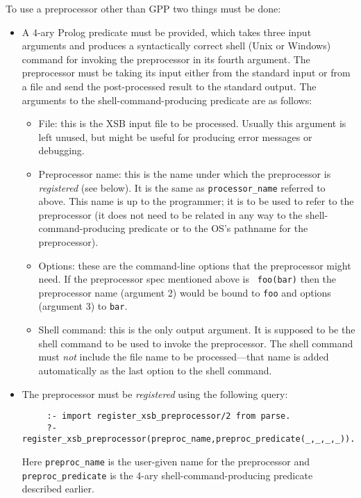 \begin{description}
  To use a preprocessor other than GPP two things must be done:
  \begin{itemize}
  \item A 4-ary Prolog predicate must be provided, which takes three input
    arguments and produces a syntactically correct shell (Unix or Windows)
    command for invoking the preprocessor in its fourth argument. The
    preprocessor must be taking its input either from the standard input
    or from a file and send the post-processed result to the standard
    output. The arguments to the shell-command-producing predicate are as
    follows:
    \begin{itemize}
    \item   File: this is the XSB input file to be processed. Usually this
      argument is left unused, but might be useful for producing error
      messages or debugging.
    \item   Preprocessor name: this is the name under which the
      preprocessor is \emph{registered} (see below). It is the same as
      {\tt processor\_name} referred to above.  This name is  
      up to the programmer; it is
      to be used to refer to the preprocessor (it does not need to be
      related in any way to
      the shell-command-producing predicate or to the OS's pathname for the
      preprocessor).
    \item Options: these are the command-line options that the preprocessor
      might need. If the preprocessor spec mentioned above is {\tt
        foo(bar)} then the preprocessor name (argument 2) would be bound to
      {\tt foo} and options (argument 3) to {\tt bar}.
    \item Shell command: this is the only output argument. It is supposed
      to be the shell command to be used to invoke the preprocessor.
      The shell command must \emph{not} include the file name to be
      processed---that name is added automatically as the last option
      to the shell command.
    \end{itemize}
  \item The preprocessor must be \emph{registered} using the following query:
\begin{verbatim}
     :- import register_xsb_preprocessor/2 from parse.
     ?- register_xsb_preprocessor(preproc_name,preproc_predicate(_,_,_,_)).
\end{verbatim}
    Here {\tt preproc\_name} is the user-given name for the preprocessor and
    {\tt preproc\_predicate} is the 4-ary shell-command-producing
    predicate described earlier.


\end{itemize}
\end{description}

